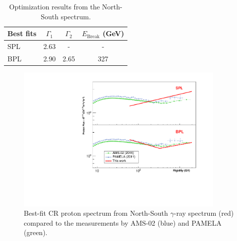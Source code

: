 \begin{table}[h!]
    \centering
    \begin{tabular}{l | c | c | c}
      Best fits & $\Gamma_1$ & $\Gamma_2$ & $E_{\text{Break}}$ (GeV) \\
      \hline \hline
      SPL & 2.63 & - & -  \\
      BPL & 2.90  & 2.65 & 327
    \end{tabular}
    \caption{Optimization results from the North-South spectrum.}
    \label{tb:bestfit_ns}
\end{table}

\begin{figure}[h]
    \centering
    \includegraphics[width=0.9\textwidth]{appendix/ns_analysis/figures/vsother.pdf}
    \caption{
        Best-fit CR proton spectrum from 
        North-South $\gamma$-ray spectrum (red)
        compared to the measurements by
        AMS-02 (blue) and PAMELA (green).
    }
    \label{fig:ns_vsother}
\end{figure}

